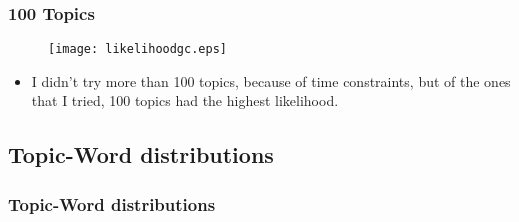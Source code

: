 \documentclass{beamer}
\begin{document}
\begin{frame}
  \frametitle{100 Topics}
  \begin{figure}
	\texttt{[image: likelihoodgc.eps]}
  \end{figure}
  \begin{itemize}
	\item I didn't try more than 100 topics, because of time constraints, but
	  of the ones that I tried, 100 topics had the highest likelihood.
  \end{itemize}
\end{frame}
\subsection{Topic-Word distributions}

\begin{frame}
  \frametitle{Topic-Word distributions}
\end{frame}
\end{document}
